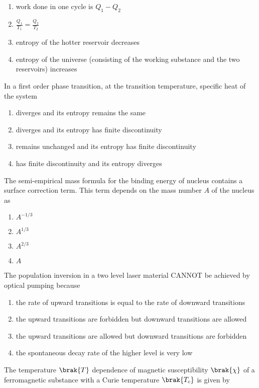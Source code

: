 \begin{enumerate}
    \item work done in one cycle is $Q_1 - Q_2$
    \item $\frac{Q_1}{T_1} = \frac{Q_2}{T_2}$
    \item entropy of the hotter reservoir decreases
    \item entropy of the universe (consisting of the working substance and the two reservoirs) increases
\end{enumerate}
\item In a first order phase transition, at the transition temperature, specific heat of the system
\begin{enumerate}
    \item diverges and its entropy remains the same
    \item diverges and its entropy has finite discontinuity
    \item remains unchanged and its entropy has finite discontinuity
    \item has finite discontinuity and its entropy diverges
    \end{enumerate}
\item The semi-empirical mass formula for the binding energy of nucleus contains a surface correction term. This term depends on the mass number $A$ of the nucleus as
\begin{enumerate}
    \item $A^{-1/3}$
    \item $A^{1/3}$
    \item $A^{2/3}$
    \item $A$
\end{enumerate}
\item The population inversion in a two level laser material CANNOT be achieved by optical pumping because
\begin{enumerate}
    \item the rate of upward transitions is equal to the rate of downward transitions
    \item the upward transitions are forbidden but downward transitions are allowed
    \item the upward transitions are allowed but downward transitions are forbidden
    \item the spontaneous decay rate of the higher level is very low
\end{enumerate}
\item The temperature $\brak{T}$ dependence of magnetic susceptibility $\brak{\chi}$ of a ferromagnetic substance with a Curie temperature $\brak{T_c}$ is given by
